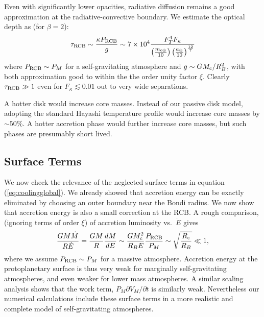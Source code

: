 \documentclass[apj]{emulateapj}
\newcommand{\p}{\partial}
\newcommand{\Eq}[1]{equation\,(\ref{#1})}
\newcommand{\co}{_{\rm c}}
\newcommand{\cb}{_{\rm RCB}}
\newcommand{\surf}{_M}
\newcommand{\mc}{m_{\rm c \oplus}}
\newcommand{\au}{a_\oplus}
\begin{document}
Even with significantly lower opacities, radiative diffusion remains a good approximation at the radiative-convective boundary.  We estimate the optical depth as (for $\beta = 2$):
\begin{equation}
\tau\cb \sim {\kappa P\cb \over g} \sim 7 \times 10^4 {F_T^4 F_\kappa \over \left(\mc \over 10 \right) \left(\au \over 10\right)^{12 \over 7}} 
\end{equation} 
where $P\cb \sim P_M$ for a self-gravitating atmosphere and $g \sim G M\co/R_B^2$, with both approximation good to within the the order unity factor $\xi$.  Clearly $\tau\cb \gg 1$ even for $F_\kappa \lesssim 0.01$ out to very wide separations.

A hotter disk would increase core masses.  Instead of our passive disk model, adopting the standard Hayashi temperature profile would increase core masses by $\sim 50\%$.  A hotter accretion phase would further increase core masses, but such phases are presumably short lived.

\subsection{Surface Terms}
We now check the relevance of the neglected surface terms in \Eq{eq:coolingglobal}.  We already showed that accretion energy can be exactly eliminated by choosing an outer boundary near the Bondi radius.   We now show that accretion energy is also a small correction at the RCB.   A rough comparison, (ignoring terms of order $\xi$) of  accretion luminosity vs.\ $\dot{E}$ gives
\begin{equation}
{G M \dot{M} \over R \dot{E}} = {G M  \over R}{dM \over dE} \sim {G M\co^2 \over R_B E}{P\cb \over P_M} \sim \sqrt{R\co \over R_B} \ll 1,
\end{equation} 
where we assume $P\cb \sim P_M$  for a massive atmosphere.  Accretion energy at the protoplanetary surface is thus very weak for marginally self-gravitating atmospheres, and even weaker for lower mass atmospheres.  A similar scaling analysis shows that the work term, $P\surf \p V\surf/\p t$ is similarly weak.  Nevertheless our numerical calculations include these surface terms in a more realistic and complete model of self-gravitating atmospheres.
\end{document}
